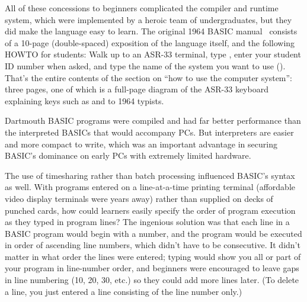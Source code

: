 
All of these concessions to beginners complicated the compiler and
runtime system, which were
implemented by a heroic team of undergraduates,
but they did make the language easy to learn.
The original 1964 BASIC manual~\cite[p. 14]{dartmouth_basic_manual}
consists of a 10-page (double-spaced) exposition of the language
itself, and the following HOWTO for students:
Walk up to an ASR-33 terminal, type , enter your student ID
number when asked, and type the name of the system you want to use
().
That's the entire contents of the section on ``how to use the computer
system'': three pages, one of which is a full-page diagram of the ASR-33
keyboard explaining keys such as  and  to 1964
typists.

\begin{tangent}
  Dartmouth BASIC programs were compiled and had
  far better performance than the interpreted BASICs that would
  accompany PCs. But interpreters are easier and more compact to write, which
  was an important advantage in securing BASIC's dominance on
  early PCs with extremely limited hardware.
\end{tangent}


The use of timesharing rather than batch processing influenced
BASIC's syntax as well.
With programs entered on a line-at-a-time printing terminal
(affordable video display
terminals were years away) rather than supplied on decks of punched
cards, how could learners easily specify the order of program execution
as they typed in program lines?
The ingenious solution was that each line in a BASIC
program would begin with a number, and the program would be
executed in order of ascending line numbers, which didn't have to be
consecutive.  
It didn't matter in what order the lines were entered;
typing  would show
you all or part of your program in line-number order,
and beginners were encouraged to leave gaps in line
numbering (10, 20, 30, etc.) so they could add
more lines later.  (To delete a line, you just entered a line
consisting of the line number only.)

